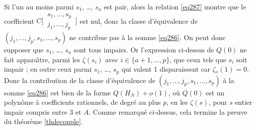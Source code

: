 \documentclass[12pt,francais, reqno]{smfart}
\numberwithin{equation}{section}
\newcommand{\cjs}{C\bigg[\,\begin{matrix} s_1, \ldots, s_p\\j_1, \ldots, j_p\end{matrix}\,\bigg]}
\newcommand{\zetaetoile}{\zeta _*}
\newcommand{\odu}{o(1)}
\begin{document}
Si l'un au moins parmi $s_1$, \ldots, $s_a$ est pair, alors la relation \eqref{eq287} montre que le coefficient 
$\cjs$ est nul, donc la classe d'\'equivalence de $(j_1,\ldots, j_p, s_1, 
\ldots, s_p)$  ne contribue pas \`a la somme \eqref{eq286}. On peut donc supposer 
que $s_1$, \ldots, $s_a$ sont tous impairs. Or l'expression  ci-dessus de $Q(0)$ ne 
fait appara\^{\i}tre, parmi les $\zeta(s_{i})$ avec $i \in \{a+1 , \ldots, p\}$, que 
ceux tels que $s_i$ soit impair ; en outre ceux parmi $s_1$, \ldots, $s_p$ qui valent 
1 disparaissent car $\zetaetoile(1) = 0$. Donc la contribution de  la classe d'\'equivalence 
de $(j_1,\ldots, j_p, s_1, \ldots, s_p)$  \`a la somme \eqref{eq286} est bien de la forme 
$Q(H_N)  + \odu$, o\`u $Q(0)$ est   un polyn\^ome  \`a coefficients rationnels, de degr\'e 
au plus $p$,  en les  $\zeta(s)$, pour $s$ entier impair compris entre 3 et $A$. Comme 
remarqu\'e ci-dessus, cela termine la preuve du th\'eor\`eme \ref{thdecouple}. 
\end{document}

